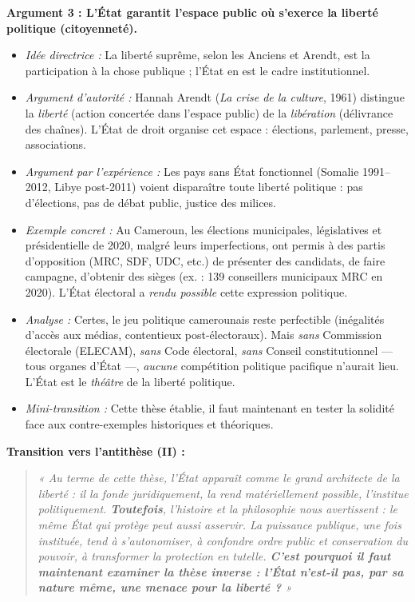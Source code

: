 \documentclass[11pt]{article}
\begin{document}
\begin{exoresolu}
\medskip
\textbf{Argument 3 : L'État garantit l'espace public où s'exerce la liberté politique (citoyenneté).}
\begin{itemize}
    \item \textit{Idée directrice :} La liberté suprême, selon les Anciens et Arendt, est la participation à la chose publique ; l'État en est le cadre institutionnel.
    \item \textit{Argument d'autorité :} Hannah Arendt (\emph{La crise de la culture}, 1961) distingue la \emph{liberté} (action concertée dans l'espace public) de la \emph{libération} (délivrance des chaînes). L'État de droit organise cet espace : élections, parlement, presse, associations.
    \item \textit{Argument par l'expérience :} Les pays sans État fonctionnel (Somalie 1991--2012, Libye post-2011) voient disparaître toute liberté politique : pas d'élections, pas de débat public, justice des milices.
    \item \textit{Exemple concret :} Au Cameroun, les élections municipales, législatives et présidentielle de 2020, malgré leurs imperfections, ont permis à des partis d'opposition (MRC, SDF, UDC, etc.) de présenter des candidats, de faire campagne, d'obtenir des sièges (ex. : 139 conseillers municipaux MRC en 2020). L'État électoral a \emph{rendu possible} cette expression politique.
    \item \textit{Analyse :} Certes, le jeu politique camerounais reste perfectible (inégalités d'accès aux médias, contentieux post-électoraux). Mais \emph{sans} Commission électorale (ELECAM), \emph{sans} Code électoral, \emph{sans} Conseil constitutionnel — tous organes d'État —, \emph{aucune} compétition politique pacifique n'aurait lieu. L'État est le \emph{théâtre} de la liberté politique.
    \item \textit{Mini-transition :} Cette thèse établie, il faut maintenant en tester la solidité face aux contre-exemples historiques et théoriques.
\end{itemize}

\medskip
\textbf{Transition vers l'antithèse (II) :}
\begin{quote}
\textit{« Au terme de cette thèse, l'État apparaît comme le grand architecte de la liberté : il la fonde juridiquement, la rend matériellement possible, l'institue politiquement. \textbf{Toutefois}, l'histoire et la philosophie nous avertissent : le même État qui protège peut aussi asservir. La puissance publique, une fois instituée, tend à s'autonomiser, à confondre ordre public et conservation du pouvoir, à transformer la protection en tutelle. \textbf{C'est pourquoi il faut maintenant examiner la thèse inverse : l'État n'est-il pas, par sa nature même, une menace pour la liberté ?} »}
\end{quote}
\end{exoresolu}
\end{document}
